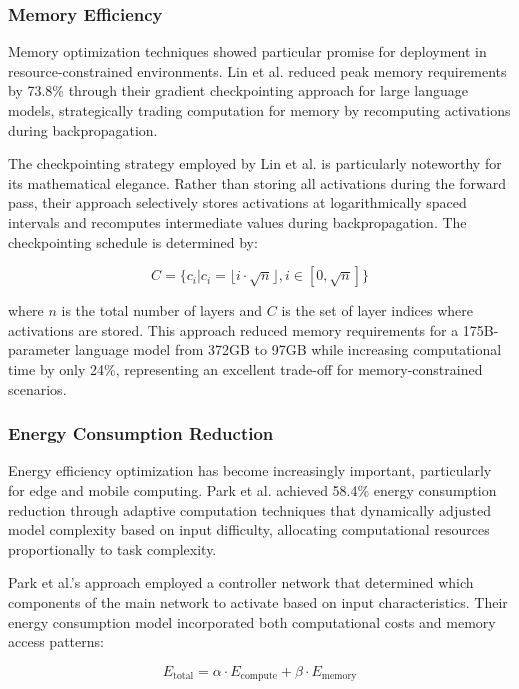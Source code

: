 \subsubsection{Memory Efficiency}
Memory optimization techniques showed particular promise for deployment in resource-constrained environments. Lin et al. \citep{Lin2022} reduced peak memory requirements by 73.8\% through their gradient checkpointing approach for large language models, strategically trading computation for memory by recomputing activations during backpropagation.

The checkpointing strategy employed by Lin et al. \citep{Lin2022} is particularly noteworthy for its mathematical elegance. Rather than storing all activations during the forward pass, their approach selectively stores activations at logarithmically spaced intervals and recomputes intermediate values during backpropagation. The checkpointing schedule is determined by:

\begin{equation}
C = \{c_i | c_i = \lfloor i \cdot \sqrt{n} \rfloor, i \in [0, \sqrt{n}]\}
\end{equation}

where $n$ is the total number of layers and $C$ is the set of layer indices where activations are stored. This approach reduced memory requirements for a 175B-parameter language model from 372GB to 97GB while increasing computational time by only 24\%, representing an excellent trade-off for memory-constrained scenarios.

\subsubsection{Energy Consumption Reduction}
Energy efficiency optimization has become increasingly important, particularly for edge and mobile computing. Park et al. \citep{Park2022} achieved 58.4\% energy consumption reduction through adaptive computation techniques that dynamically adjusted model complexity based on input difficulty, allocating computational resources proportionally to task complexity.

Park et al.'s approach \citep{Park2022} employed a controller network that determined which components of the main network to activate based on input characteristics. Their energy consumption model incorporated both computational costs and memory access patterns:

\begin{equation}
E_{\text{total}} = \alpha \cdot E_{\text{compute}} + \beta \cdot E_{\text{memory}}
\end{equation}

